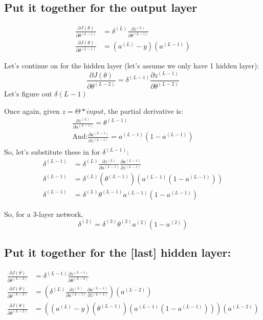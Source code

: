 \subsection{Put it together for the output layer}
\begin{align*}
\frac{\partial J(\theta)}{\partial \theta^{(L-1)}} &= \delta^{(L)} \frac{\partial z^{(L)}}{\partial \theta^{(L-1)}}  \\
\frac{\partial J(\theta)}{\partial \theta^{(L-1)}} &= (a^{(L)} - y) (a^{(L-1)}) 
\end{align*}

Let's continue on for the hidden layer (let's assume we only have 1 hidden layer):
\[
\frac{\partial J(\theta)}{\partial \theta^{(L-2)}} = \delta^{(L-1)} \frac{\partial z^{(L-1)}}{\partial \theta^{(L-2)}} 
\]
Let's figure out $\delta{(L-1)}$

Once again, given $z=\Theta*input$, the partial derivative is:
\begin{align*}
\frac{\partial z^{(L)}}{\partial a^{(L-1)}} = \theta^{(L-1)} \\
\text{And:} \frac{\partial a^{(L-1)}}{\partial z^{(L-1)}} = a^{(L-1)}(1-a^{(L-1)}) \\
\end{align*}
So, let's substitute these in for $\delta^{(L-1)}$:
\begin{align*}
\delta^{(L-1)} &= \delta^{(L)} \frac{\partial z^{(L)}}{\partial a^{(L-1)}} \frac{\partial a^{(L-1)}}{\partial z^{(L-1)}} \\
\delta^{(L-1)} &= \delta^{(L)} (\theta^{(L-1)}) (a^{(L-1)}(1-a^{(L-1)})) \\
\delta^{(L-1)} &= \delta^{(L)} \theta^{(L-1)} a^{(L-1)}(1-a^{(L-1)})
\end{align*}

So, for a 3-layer network,
\[
\delta^{(2)} = \delta^{(3)} \theta^{(2)} a^{(2)}(1-a^{(2)})
\]
\subsection{Put it together for the [last] hidden layer:}
\begin{align*}
\frac{\partial J(\theta)}{\partial \theta^{(L-2)}} &= \delta^{(L-1)} \frac{\partial z^{(L-1)}}{\partial \theta^{(L-2)}}  \\
\frac{\partial J(\theta)}{\partial \theta^{(L-2)}} &= (\delta^{(L)} \frac{\partial z^{(L)}}{\partial a^{(L-1)}} \frac{\partial a^{(L-1)}}{\partial z^{(L-1)}}) (a^{(L-2)}) \\
\frac{\partial J(\theta)}{\partial \theta^{(L-2)}} &= ((a^{(L)} - y) (\theta^{(L-1)})(a^{(L-1)}(1-a^{(L-1)}))) (a^{(L-2)})
\end{align*}

